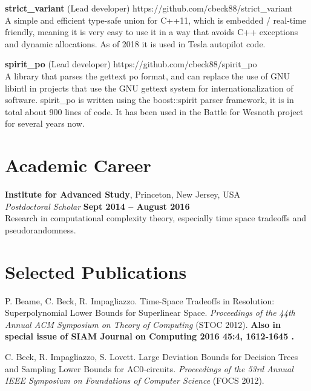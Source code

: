 \documentclass[margin,line]{resume}
\begin{document}
\begin{resume}
    \textbf{strict\_variant} (Lead developer) \hfill https://github.com/cbeck88/strict\_variant \\
    A simple and efficient type-safe union for C++11, which is embedded / real-time friendly, meaning it is very easy
    to use it in a way that avoids C++ exceptions and dynamic allocations. As of 2018 it is used in Tesla autopilot code.

    \textbf{spirit\_po} (Lead developer) \hfill https://github.com/cbeck88/spirit\_po \\
    A library that parses the gettext po format, and can replace the use of GNU libintl in projects that use the GNU
    gettext system for internationalization of software.
    spirit\_po is written using the boost::spirit parser framework, it is in total about 900 lines of code.
    It has been used in the Battle for Wesnoth project for several years now.


\section{\mysidestyle Academic Career}

    \textbf{Institute for Advanced Study}, Princeton, New Jersey, USA \vspace{2mm}\\\vspace{1mm}%
    \textsl{Postdoctoral Scholar} \hfill \textbf{Sept 2014 -- August 2016}\\
    Research in computational complexity theory, especially time space tradeoffs and pseudorandomness.

    \section{\mysidestyle Selected Publications}

    P. Beame, C. Beck, R. Impagliazzo. Time-Space Tradeoffs in Resolution: Superpolynomial Lower Bounds for Superlinear Space. \textsl{Proceedings of the 44th Annual ACM Symposium on Theory of Computing } (STOC 2012). {\bf Also in special issue of SIAM Journal on Computing 2016 45:4, 1612-1645 .}

\vspace{-2mm}
    C. Beck, R. Impagliazzo, S. Lovett. Large Deviation Bounds for Decision Trees and Sampling Lower Bounds for AC0-circuits. \textsl{Proceedings of the 53rd Annual IEEE Symposium on Foundations of Computer Science} (FOCS 2012). 


\end{resume}
\end{document}

